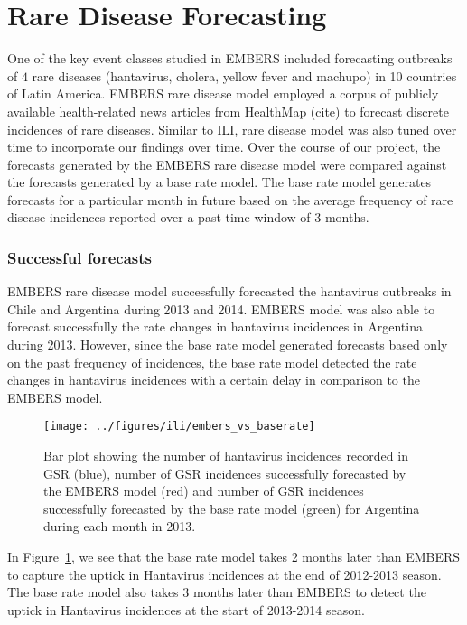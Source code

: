 \section{Rare Disease Forecasting}

One of the key event classes studied in EMBERS included forecasting outbreaks of $4$ rare diseases (hantavirus, cholera, yellow fever and machupo) in 10 countries of Latin America. EMBERS rare disease model employed a corpus of publicly available health-related news articles from HealthMap (cite) to forecast discrete incidences of rare diseases. Similar to ILI, rare disease model was also tuned over time to incorporate our findings over time. Over the course of our project, the forecasts generated by the EMBERS rare disease model were compared against the forecasts generated by a base rate model. The base rate model generates forecasts for a particular month in future based on the average frequency of rare disease incidences reported over a past time window of 3 months.


\subsubsection{Successful forecasts}

EMBERS rare disease model successfully forecasted the hantavirus outbreaks in Chile and Argentina during 2013 and 2014. EMBERS model was also able to forecast successfully the rate changes in hantavirus incidences in Argentina during 2013. However, since the base rate model generated forecasts based only on the past frequency of incidences, the base rate model detected the rate changes in hantavirus incidences with a certain delay in comparison to the EMBERS model. 

\begin{figure}
  \texttt{[image: ../figures/ili/embers\_vs\_baserate]}
  \caption{\label{fig:embers_vs_baserate} Bar plot showing the number of hantavirus incidences recorded in GSR (blue), number of GSR incidences successfully forecasted by the EMBERS model (red) and number of GSR incidences successfully forecasted by the base rate model (green) for Argentina during each month in 2013.}
\end{figure}

In Figure~\ref{fig:embers_vs_baserate}, we see that the base rate model takes 2 months later than EMBERS to capture the uptick in Hantavirus incidences at the end of 2012-2013 season. The base rate model also takes 3 months later than EMBERS to detect the uptick in Hantavirus incidences at the start of 2013-2014 season. 


